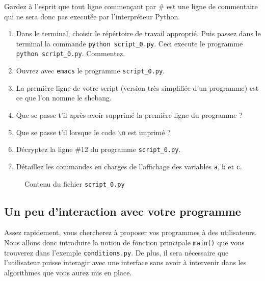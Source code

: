 Gardez à l'esprit que tout ligne commençant par \# est une ligne de commentaire qui ne
sera donc pas executée par l'interpréteur Python.

%

\begin{enumerate}
\item Dans le terminal, choisir le répértoire de travail approprié. Puis passez dans le terminal la commande \texttt{python script\_0.py}. Ceci execute le programme \texttt{python script\_0.py}. Commentez.

\item Ouvrez avec \texttt{emacs} le programme \texttt{script\_0.py}.

\item La première ligne de votre script (version très simplifiée d'un programme)
  est ce que l'on nomme le shebang.

\item Que se passe t'il après avoir supprimé la première ligne du programme ?

\item Que se passe t'il lorsque le code \texttt{$\backslash$n} est imprimé ?

\item Décryptez la ligne \#12 du programme \texttt{script\_0.py}.

\item Détaillez les commandes en charges de l'affichage des variables \texttt{a}, \texttt{b} et \texttt{c}.
\end{enumerate}
\begin{figure}  
  
  \caption{Contenu du fichier \texttt{script\_0.py}}
  \label{polynome_script_0}
\end{figure}



\subsection{Un peu d'interaction avec votre programme}


Assez rapidement, vous chercherez à proposer vos programmes à des utilisateurs.
Nous allons donc introduire la notion de fonction principale \texttt{main()} que vous trouverez dans l'exemple
\texttt{conditions.py}.
De plus, il sera nécessaire que l'utilisateur puisse interagir avec une interface sans avoir à intervenir
dans les algorithmes que vous aurez mis en place.


